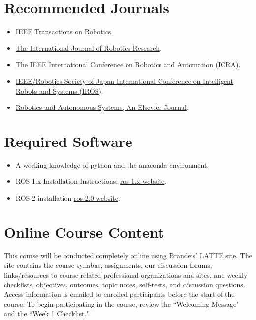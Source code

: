 \section{Recommended Journals}
	\begin{itemize}
		\item 
		\href{ https://ieeexplore.ieee.org/xpl/RecentIssue.jsp?punumber=8860}{IEEE Transactions on Robotics}.
		\item 
		\href{https://journals.sagepub.com/home/ijr}{The International Journal of Robotics Research}.
		\item 
		\href{https://www.ieee-ras.org/conferences-workshops/fully-sponsored/icra}{The IEEE International Conference on Robotics and Automation (ICRA)}.
		\item \href{https://www.ieee-ras.org/conferences-workshops/financially-co-sponsored/iros}{IEEE/Robotics Society of Japan International Conference on Intelligent Robots and Systems (IROS)}.
		\item \href{https://www.journals.elsevier.com/robotics-and-autonomous-systems}{Robotics and Autonomous Systems, An Elsevier Journal}.
	\end{itemize}

\section{Required Software}
	
	\begin{itemize}
	\item A working knowledge of python and the anaconda environment.
	\item ROS 1.x Installation Instructions:  \href{https://www.ros.org/}{ros 1.x website}.
	\item ROS 2 installation \href{https://index.ros.org/doc/ros2/Installation/Crystal/Linux-Install-Binary/}{ros 2.0 website}.
	\end{itemize}

\section{Online Course Content}
%
This course will be conducted completely online using Brandeis’ LATTE \href{http://moodle2.brandeis.edu}{site}. The site contains the course syllabus, assignments, our discussion forums, links/resources to course-related professional organizations and sites, and weekly checklists, objectives, outcomes, topic notes, self-tests, and discussion questions.  Access information is emailed to enrolled participants before the start of the course.   To begin participating in the course, review the ``Welcoming Message" and the ``Week 1 Checklist."

